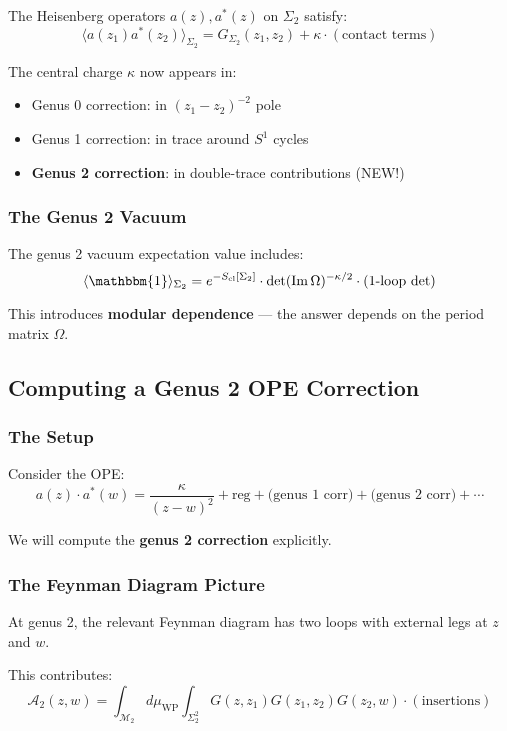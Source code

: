 The Heisenberg operators $a(z), a^*(z)$ on $\Sigma_2$ satisfy:
$$\langle a(z_1) a^*(z_2) \rangle_{\Sigma_2} = G_{\Sigma_2}(z_1, z_2) + \kappa \cdot (\text{contact terms})$$

The central charge $\kappa$ now appears in:
\begin{itemize}
\item Genus 0 correction: in $(z_1 - z_2)^{-2}$ pole
\item Genus 1 correction: in trace around $S^1$ cycles
\item \textbf{Genus 2 correction}: in double-trace contributions (NEW!)
\end{itemize}

\subsubsection{The Genus 2 Vacuum}

The genus 2 vacuum expectation value includes:
$$\langle \mathbbm{1} \rangle_{\Sigma_2} = e^{-S_{\text{cl}}[\Sigma_2]}
\cdot \det(\operatorname{Im} \Omega)^{-\kappa/2} \cdot (\text{1-loop det})$$

This introduces \textbf{modular dependence} --- the answer depends on the period
matrix $\Omega$.

\subsection{Computing a Genus 2 OPE Correction}

\subsubsection{The Setup}

Consider the OPE:
$$a(z) \cdot a^*(w) = \frac{\kappa}{(z-w)^2} + \text{reg} 
+ \text{(genus 1 corr)} + \text{(genus 2 corr)} + \cdots$$

We will compute the \textbf{genus 2 correction} explicitly.

\subsubsection{The Feynman Diagram Picture}

At genus 2, the relevant Feynman diagram has two loops with external legs at $z$ and $w$.

This contributes:
$$\mathcal{A}_2(z,w) = \int_{\mathcal{M}_2} d\mu_{\text{WP}} 
\int_{\Sigma_2^2} G(z, z_1) G(z_1, z_2) G(z_2, w) \cdot (\text{insertions})$$

